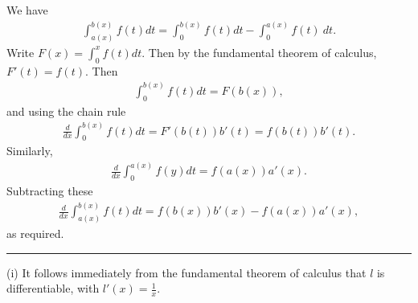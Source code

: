 \documentclass[letterpaper,10pt,english]{jupyterBook}
\begin{document}
\sphinxAtStartPar
{\hyperref[\detokenize{Problems:id72}]{}} We have
\begin{equation*}
\begin{split}
\int_{a(x)}^{b(x)} f(t)dt =  \int_0^{b(x)} f(t)dt - \int_0^{a(x)} f(t)\ dt.
\end{split}
\end{equation*}
\sphinxAtStartPar
Write \(F(x)=\int_0^x f(t)dt.\) Then by the fundamental theorem of calculus, \( F'(t)=f(t)\). Then
\begin{equation*}
\begin{split}
\int_0^{b(x)} f(t)dt=F(b(x)),
\end{split}
\end{equation*}
\sphinxAtStartPar
and using the chain rule
\begin{equation*}
\begin{split}
\frac{d}{dx}\int_0^{b(x)} f(t)dt =F'(b(t))b'(t)=f(b(t))b'(t).
\end{split}
\end{equation*}
\sphinxAtStartPar
Similarly,
\begin{equation*}
\begin{split}
\frac{d}{dx}\int_0^{a(x)} f(y)dt =f(a(x))a'(x).
\end{split}
\end{equation*}
\sphinxAtStartPar
Subtracting these
\begin{equation*}
\begin{split}
\frac{d}{dx}\int_{a(x)}^{b(x)} f(t)dt =f(b(x))b'(x) - f(a(x))a'(x),
\end{split}
\end{equation*}
\sphinxAtStartPar
as required.


\bigskip\hrule\bigskip


\sphinxAtStartPar
{\hyperref[\detokenize{Problems:id73}]{}}
(i) It follows immediately from the fundamental theorem of calculus that \(l\) is differentiable, with \(l'(x)=\frac{1}{x}\).
\end{document}
